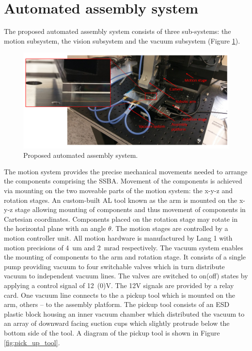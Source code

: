 \section{Automated assembly system}

The proposed automated assembly system consists of three sub-systems: the motion subsystem, the vision subsystem and the vacuum subsystem (Figure \ref{fig:auto_assembly_system})\cite{AutomatedAssembly_tutorial}.

\begin{figure}[ht]\centering
\includegraphics[width=1\linewidth]{Data/Module_assembly/Automated_assembly_system.png}
\caption{Proposed automated assembly system.}
\label{fig:auto_assembly_system}
\end{figure}

The motion system provides the precise mechanical movements needed to arrange the components comprising the SSBA. Movement of the components is achieved via mounting on the two moveable parts of the motion system: the x-y-z and rotation stages. An custom-built AL tool known as the arm is mounted on the x-y-z stage allowing mounting of components and thus movement of components in Cartesian coordinates. Components placed on the rotation stage may rotate in the horizontal plane with an angle $\theta$. The motion stages are controlled by a motion controller unit. All motion hardware is manufactured by Lang 1 with motion precisions of 4~um and 2~mrad respectively. The vacuum system enables the mounting of components to the arm and rotation stage. It consists of a single pump providing vacuum to four switchable valves which in turn distribute vacuum to independent vacuum lines. The valves are switched to on(off) states by applying a control signal of 12~(0)V. The 12V signals are provided by a relay card. One vacuum line connects to the a pickup tool which is mounted on the arm, others -- to the assembly platform. The pickup tool consists of an ESD plastic block housing an inner vacuum chamber which distributed the vacuum to an array of downward facing suction cups which slightly protrude below the bottom side of the tool. A diagram of the pickup tool is shown in Figure \ref{fig:pick_up_tool}.

